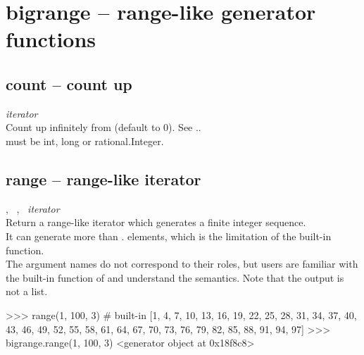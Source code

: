 

 \section{bigrange -- range-like generator functions}
%
  \subsection{count -- count up}
   {%
   }{%
     {\em iterator}
   }\\
   \spacing
   \quad Count up infinitely from  (default to \(0\)).
   See ..\\
   \spacing
   \quad {} must be int, long or rational.Integer.\\

  \subsection{range -- range-like iterator}
   {%
     ,\ %
     ,\ %
   }{%
     {\em iterator}
   }\\
   \spacing
   \quad Return a range-like iterator which generates a finite integer sequence.\\
   \spacing
   \quad  It can generate more than
   . elements,
   which is the limitation of the 
   built-in function.\\
   \spacing
   \quad The argument names do not correspond to their roles, but
   users are familiar with the
    built-in function of
   \python and understand the semantics.
   Note that the output is not a list.\\
%
\begin{ex}
>>> range(1, 100, 3) # built-in
[1, 4, 7, 10, 13, 16, 19, 22, 25, 28, 31, 34, 37, 40, 43, 46,
 49, 52, 55, 58, 61, 64, 67, 70, 73, 76, 79, 82, 85, 88, 91,
 94, 97]
>>> bigrange.range(1, 100, 3)
<generator object at 0x18f8c8>
\end{ex}%

